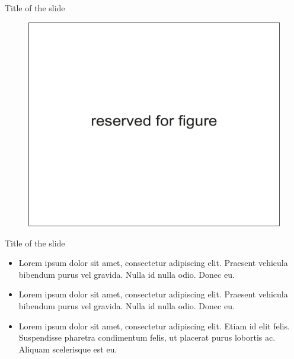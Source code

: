 \documentclass[russian,12pt,aspectratio=169,xcolor=table]{beamer}
\begin{document}
\begin{frame}{Title of the slide}
\begin{minipage}{.41\textwidth}
\begin{figure}
	\vspace{-2em}
\end{figure}
\begin{figure}
	\centering
	\includegraphics[height=0.45\textheight]{img/5}
\end{figure}
\end{minipage}
\end{frame}

\begin{frame}{Title of the slide}
	\begin{itemize}
		\item Lorem ipsum dolor sit amet, consectetur adipiscing elit. Praesent vehicula bibendum purus vel gravida. Nulla id nulla odio. Donec eu.
		\item Lorem ipsum dolor sit amet, consectetur adipiscing elit. Praesent vehicula bibendum purus vel gravida. Nulla id nulla odio. Donec eu.
		\item Lorem ipsum dolor sit amet, consectetur adipiscing elit. Etiam id elit felis. Suspendisse pharetra condimentum felis, ut placerat purus lobortis ac. Aliquam scelerisque est eu.
	\end{itemize}
\end{frame}
\end{document}
